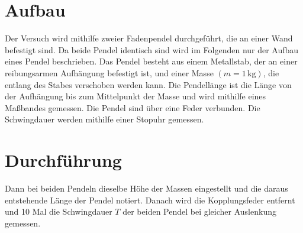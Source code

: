 \section{Aufbau}
\label{sec:Aufbau}
Der Versuch wird mithilfe zweier Fadenpendel durchgeführt, die an einer Wand befestigt sind. Da beide Pendel identisch sind wird im Folgenden 
nur der Aufbau eines Pendel beschrieben. 
Das Pendel besteht aus einem Metallstab, der an einer reibungsarmen Aufhängung befestigt ist, und einer Masse $(m = 1 \,\unit{\kilo\gram})$, 
die entlang des Stabes verschoben werden kann. Die Pendellänge ist die Länge von der Aufhängung bis zum Mittelpunkt der Masse und wird mithilfe eines 
Maßbandes gemessen.
Die Pendel sind über eine Feder verbunden. Die Schwingdauer werden mithilfe einer Stopuhr gemessen. 

\section{Durchführung}
\label{sec:Durchführung}
Dann bei beiden Pendeln dieselbe Höhe der Massen eingestellt und die daraus entstehende Länge der Pendel notiert. 
Danach wird die Kopplungsfeder entfernt und 10 Mal die Schwingdauer $T$ der beiden Pendel bei gleicher Auslenkung gemessen. 